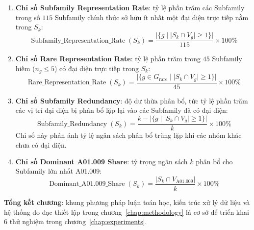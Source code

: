 \begin{enumerate}
    \item \textbf{Chỉ số Subfamily Representation Rate}: tỷ lệ phần trăm các Subfamily trong số $115$ Subfamily chính thức sở hữu ít nhất một đại diện trực tiếp nằm trong $S_k$:
    \begin{equation}
    \label{eq:subfamily_repr_rate}
    \operatorname{Subfamily\_Representation\_Rate}(S_k) = \frac{|\{g \mid |S_k \cap V_g| \ge 1\}|}{115} \times 100\%
    \end{equation}
    
    \item \textbf{Chỉ số Rare Representation Rate}: tỷ lệ phần trăm trong $45$ Subfamily hiếm ($n_g \le 5$) có đại diện trực tiếp trong $S_k$:
    \begin{equation}
    \label{eq:rare_repr_rate}
    \operatorname{Rare\_Representation\_Rate}(S_k) = \frac{|\{g \in G_{\text{rare}} \mid |S_k \cap V_g| \ge 1\}|}{45} \times 100\%
    \end{equation}
    
    \item \textbf{Chỉ số Subfamily Redundancy}: độ dư thừa phân bổ, tức tỷ lệ phần trăm các vị trí đại diện bị phân bổ lặp lại vào các Subfamily đã có đại diện:
    \begin{equation}
    \label{eq:subfamily_redundancy}
    \operatorname{Subfamily\_Redundancy}(S_k) = \frac{k - |\{g \mid |S_k \cap V_g| \ge 1\}|}{k} \times 100\%
    \end{equation}
    Chỉ số này phản ánh tỷ lệ ngân sách phân bổ trùng lặp khi các nhóm khác chưa có đại diện.
    
    \item \textbf{Chỉ số Dominant A01.009 Share}: tỷ trọng ngân sách $k$ phân bổ cho Subfamily lớn nhất A01.009:
    \begin{equation}
    \label{eq:dominant_share}
    \operatorname{Dominant\_A01.009\_Share}(S_k) = \frac{|S_k \cap V_{\text{A01.009}}|}{k} \times 100\%
    \end{equation}
\end{enumerate}

\noindent\textbf{Tổng kết chương}: khung phương pháp luận toán học, kiến trúc xử lý dữ liệu và hệ thống đo đạc thiết lập trong chương~\ref{chap:methodology} là cơ sở để triển khai 6 thử nghiệm trong chương~\ref{chap:experiments}.
